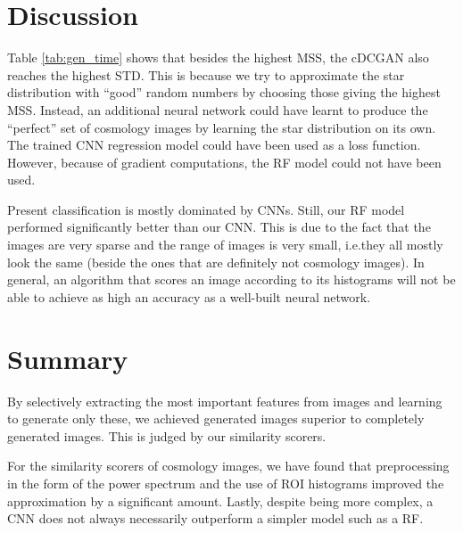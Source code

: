 \documentclass[10pt,conference,compsocconf]{IEEEtran}
\newcommand\TODO[1]{\textcolor{red}{#1}} %
\begin{document}
\section{Discussion}
Table \ref{tab:gen_time} shows that besides the highest MSS, the cDCGAN also reaches the highest STD. This is because we try to approximate the star distribution with ``good'' random numbers by choosing those giving the highest MSS. Instead, an additional neural network could have learnt to produce the ``perfect'' set of cosmology images by learning the star distribution on its own. The trained CNN regression model could have been used as a loss function. However, because of gradient computations, the RF model could not have been used. 

Present classification is mostly dominated by CNNs. Still, our RF model performed significantly better than our CNN. This is due to the fact that the images are very sparse and the range of images is very small, i.e.\@ they all mostly look the same (beside the ones that are definitely not cosmology images). In general, an algorithm that scores an image according to its histograms will not be able to achieve as high an accuracy as a well-built neural network. 

\section{Summary}
By selectively extracting the most important features from images and learning to generate only these, we achieved generated images superior to completely generated images.
This is judged by our similarity scorers. 

For the similarity scorers of cosmology images, we have found that preprocessing in the form of the power spectrum and the use of ROI histograms improved the approximation by a significant amount. Lastly, despite being more complex, a CNN does not always necessarily outperform a simpler model such as a RF.





\end{document}
